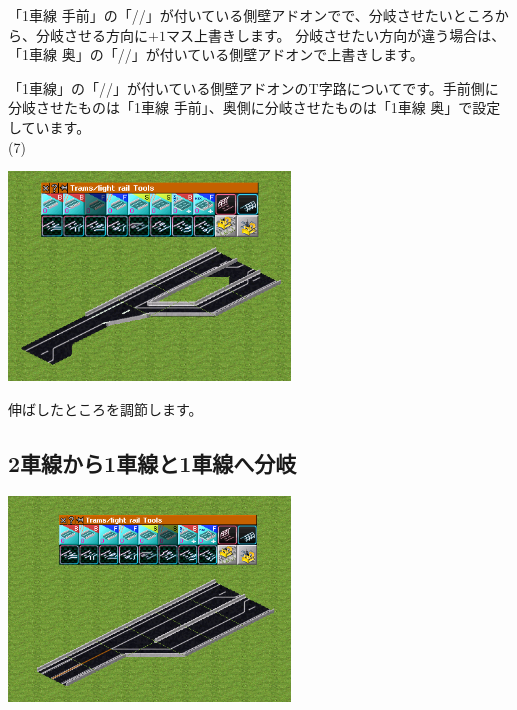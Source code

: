 \documentclass{jbook}
\begin{document}
\begin{multicols}{2}
「1車線 手前」の「//」が付いている側壁アドオンでで、分岐させたいところから、分岐させる方向に$+1$マス上書きします。
分岐させたい方向が違う場合は、「1車線 奥」の「//」が付いている側壁アドオンで上書きします。

「1車線」の「//」が付いている側壁アドオンのT字路についてです。手前側に分岐させたものは「1車線 手前」、奥側に分岐させたものは「1車線 奥」で設定しています。\\


(7)

\includegraphics[width = 75mm]{picture/20210214-road-2-8.png}

伸ばしたところを調節します。\\

\end{multicols}


\newpage

\subsection{2車線から1車線と1車線へ分岐}
\label{sub:2lane_to_1lane+1lane}

\includegraphics[width = 75mm]{picture/20210214-road-3-6.png}
\vspace{10pt}
\end{document}
